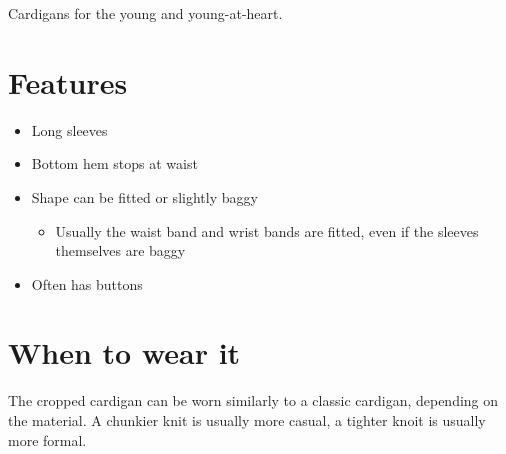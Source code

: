 \documentclass[
  openany]{book}
\providecommand{\tightlist}{%
  \setlength{\itemsep}{0pt}\setlength{\parskip}{0pt}}
\begin{document}
Cardigans for the young and young-at-heart.

\hypertarget{features-1}{%
\section{Features}\label{features-1}}

\begin{itemize}
\tightlist
\item
  Long sleeves
\item
  Bottom hem stops at waist
\item
  Shape can be fitted or slightly baggy

  \begin{itemize}
  \tightlist
  \item
    Usually the waist band and wrist bands are fitted, even if the sleeves themselves are baggy
  \end{itemize}
\item
  Often has buttons
\end{itemize}

\hypertarget{when-to-wear-it-1}{%
\section{When to wear it}\label{when-to-wear-it-1}}

The cropped cardigan can be worn similarly to a classic cardigan, depending on the material. A chunkier knit is usually more casual, a tighter knoit is usually more formal.
\end{document}
